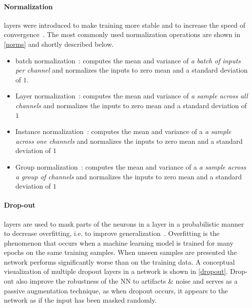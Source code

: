 \paragraph{Normalization} layers were introduced to make training more stable and to increase the speed of convergence~\autocite{ioffe_batch_2015}.
The most commonly used normalization operations are shown in \ref{norms} and shortly described below.
\begin{itemize}
 \item batch normalization~\autocite{ioffe_batch_2015}: computes the mean and variance of \textit{a batch of inputs per channel} and normalizes the inputs to zero mean and a standard deviation of $1$.
 \item Layer normalization~\autocite{ba_layer_2016}: computes the mean and variance of \textit{ a sample across all channels} and normalizes the inputs to zero mean and a standard deviation of $1$
 \item Instance normalization~\autocite{ulyanov_instance_2017}: computes the mean and variance of a \textit{a sample across one channels} and normalizes the inputs to zero mean and a standard deviation of $1$
 \item Group normalization~\autocite{wu_group_2018}: computes the mean and variance of a \textit{a sample across a group of channels} and normalizes the inputs to zero mean and a standard deviation of $1$
\end{itemize}

\paragraph{Drop-out} layers are used to mask parts of the neurons in a layer in a probabilistic manner to decrease overfitting, i.e. to improve generalization~\autocite{srivastava_dropout_2014}.
Overfitting is the phenomenon that occurs when a machine learning model is trained for many epochs on the same training samples.
When unseen samples are presented the network performs significantly worse than on the training data.
A conceptual visualization of multiple dropout layers in a network is shown in \ref{dropout}.
Drop-out also improve the robustness of the NN to artifacts \& noise and serves as a passive augmentation technique, as when dropout occurs, it appears to the network as if the input has been masked randomly.

